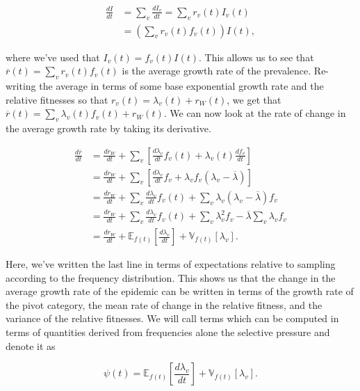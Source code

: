 \documentclass[11pt,oneside,letterpaper]{article}
\newcommand{\Expect}{\mathbb{E}}
\newcommand{\Var}{\mathbb{V}}
\newcommand{\wt}{W}
\begin{document}
\begin{align*}
    \frac{d I}{d t} &= \sum_{v} \frac{d I_{v}}{d t} =  \sum_{v} r_{v}(t) I_{v}(t)\\
                    &= \left( \sum_{v} r_{v}(t) f_{v}(t) \right) I(t),
\end{align*}

where we've used that $I_{v}(t) = f_{v}(t) I(t)$.
This allows us to see that $\overline{r}(t) = \sum_{v} r_{v}(t) f_{v}(t)$ is the average growth rate of the prevalence.
Re-writing the average in terms of some base exponential growth rate and the relative fitnesses so that $r_{v}(t) = \lambda_{v}(t) + r_\wt(t)$, we get that $\overline{r}(t) = \sum_{v} \lambda_{v}(t)f_{v}(t) + r_\wt(t)$.
We can now look at the rate of change in the average growth rate by taking its derivative.

\begin{align*}
    \frac{d \overline{r}}{d t} &= \frac{d r_{\wt}}{d t} + \sum_{v} \left[\frac{d \lambda_v}{d t} f_{v}(t) + \lambda_{v}(t) \frac{d f_{v}}{d t} \right]\\
                               &= \frac{d r_{\wt}}{d t} + \sum_{v} \left[\frac{d \lambda_v}{d t} f_{v} + \lambda_{v} f_{v} (\lambda_{v} - \overline{\lambda})  \right]\\
                               &= \frac{d r_{\wt}}{dt} + \sum_{v} \frac{d \lambda_v}{d t} f_{v}(t) + \sum_{v} \lambda_{v} (\lambda_{v} - \overline{\lambda}) f_{v}\\
                               &= \frac{d r_{\wt}}{dt} + \sum_{v} \frac{d \lambda_v}{d t} f_{v}(t) + \sum_{v} \lambda_{v}^{2} f_{v} - \overline{\lambda}\sum_{v} \lambda_{v} f_{v}\\
                               &= \frac{d r_{\wt}}{d t} + \Expect_{f(t)}\left[ \frac{d \lambda_v}{d t}\right] +  \Var_{f(t)}[\lambda_{v}].
\end{align*}

Here, we've written the last line in terms of expectations relative to sampling according to the frequency distribution.
This shows us that the change in the average growth rate of the epidemic can be written in terms of the growth rate of the pivot category, the mean rate of change in the relative fitness, and the variance of the relative fitnesses.
We will call terms which can be computed in terms of quantities derived from frequencies alone the selective pressure and denote it as

\begin{equation}
\psi(t) =  \Expect_{f(t)}\left[ \frac{d \lambda_v}{d t}\right] +  \Var_{f(t)}[\lambda_{v}].
\end{equation}
\end{document}
